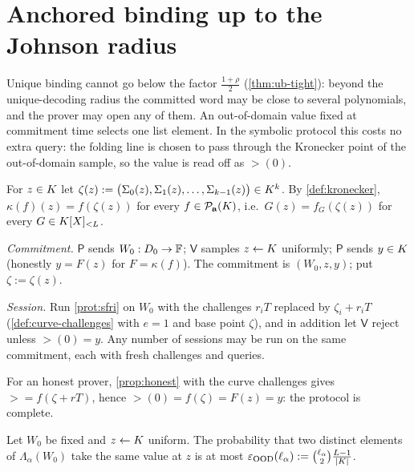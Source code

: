\section{Anchored binding up to the Johnson radius}

Unique binding cannot go below the factor $\frac{1+\rho}2$ (\cref{thm:ub-tight}): beyond the
unique-decoding radius the committed word may be close to several polynomials, and the
prover may open any of them. An out-of-domain value fixed at commitment time selects one
list element. In the symbolic protocol this costs no extra query: the folding line is
chosen to pass through the Kronecker point of the out-of-domain sample, so the value is
read off as $\gt(0)$.

\begin{definition}\label{def:kronecker-point}
For $z\in K$ let $\zeta(z):=\bigl(\Sigma_0(z),\Sigma_1(z),\dots,\Sigma_{k-1}(z)\bigr)\in K^k$.
By \cref{def:kronecker}, $\kappa(f)(z)=f(\zeta(z))$ for every $f\in\mathcal{P}_{\mathbf a}(K)$, i.e.\
$G(z)=f_G(\zeta(z))$ for every $G\in K[X]_{<L}$.
\end{definition}

\begin{protocol}\label{prot:anchored}
\emph{Commitment.} $\mathsf P$ sends $W_0:D_0\to\mathbb{F}$; $\mathsf V$ samples $z\leftarrow K$
uniformly; $\mathsf P$ sends $y\in K$ (honestly $y=F(z)$ for $F=\kappa(f)$). The commitment is
$(W_0,z,y)$; put $\zeta:=\zeta(z)$.

\emph{Session.} Run \cref{prot:sfri} on $W_0$ with the challenges $r_{i}T$ replaced by
$\zeta_i+r_iT$ (\cref{def:curve-challenges} with $e=1$ and base point $\zeta$), and in
addition let $\mathsf V$ reject unless $\gt(0)=y$. Any number of sessions may be run on
the same commitment, each with fresh challenges and queries.
\end{protocol}

For an honest prover, \cref{prop:honest} with the curve challenges gives
$\gt=f(\zeta+rT)$, hence $\gt(0)=f(\zeta)=F(z)=y$: the protocol is complete.

\begin{lemma}\label{lem:ood}
Let $W_0$ be fixed and $z\leftarrow K$ uniform. The probability that two distinct elements of
$\Lambda_\alpha(W_0)$ take the same value at $z$ is at most
$\varepsilon_{\mathrm{OOD}}(\ell_\alpha):=\binom{\ell_\alpha}2\frac{L-1}{|K|}$.
\end{lemma}

